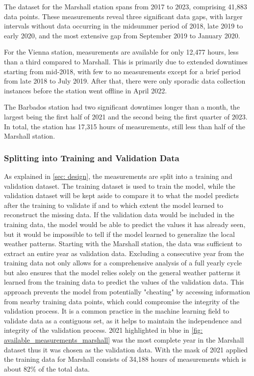 The dataset for the Marshall station spans from 2017 to 2023, comprising 41,883 data points. These measurements reveal three significant data gaps, with larger intervals without data occurring in the midsummer period of 2018, late 2019 to early 2020, and the most extensive gap from September 2019 to January 2020.

For the Vienna station, measurements are available for only 12,477 hours, less than a third compared to Marshall. This is primarily due to extended downtimes starting from mid-2018, with few to no measurements except for a brief period from late 2018 to July 2019. After that, there were only sporadic data collection instances before the station went offline in April 2022.

The Barbados station had two significant downtimes longer than a month, the largest being the first half of 2021 and the second being the first quarter of 2023. In total, the station has 17,315 hours of measurements, still less than half of the Marshall station.

\subsubsection*{Splitting into Training and Validation Data}

As explained in \autoref{sec: design}, the measurements are split into a training and validation dataset. The training dataset is used to train the model, while the validation dataset will be kept aside to compare it to what the model predicts after the training to validate if and to which extent the model learned to reconstruct the missing data. If the validation data would be included in the training data, the model would be able to predict the values it has already seen, but it would be impossible to tell if the model learned to generalize the local weather patterns.
Starting with the Marshall station, the data was sufficient to extract an entire year as validation data. Excluding a consecutive year from the training data not only allows for a comprehensive analysis of a full yearly cycle but also ensures that the model relies solely on the general weather patterns it learned from the training data to predict the values of the validation data. This approach prevents the model from potentially "cheating" by accessing information from nearby training data points, which could compromise the integrity of the validation process. It is a common practice in the machine learning field to validate data as a contiguous set, as it helps to maintain the independence and integrity of the validation process. 2021 highlighted in blue in \ref{fig: available_measurements_marshall} was the most complete year in the Marshall dataset thus it was chosen as the validation data. With the mask of 2021 applied the training data for Marshall consists of 34,188 hours of measurements which is about 82\% of the total data.

